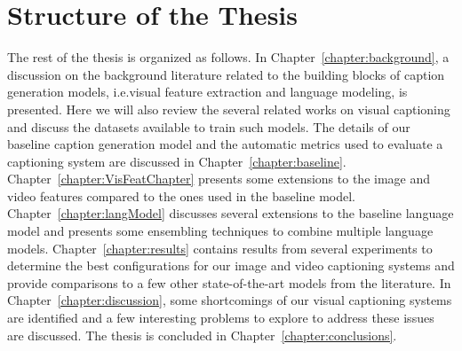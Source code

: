 \section{Structure of the Thesis}
\label{section:structure} 
The rest of the thesis is organized as follows.
In Chapter~\ref{chapter:background}, a discussion on the background literature
related to the building blocks of caption generation models, i.e.\@ visual
feature extraction and language modeling, is presented. 
Here we will also review the several related works on visual captioning
and discuss the datasets available to train such models.
The details of our baseline caption generation model and the automatic metrics
used to evaluate a captioning system are discussed in
Chapter~\ref{chapter:baseline}. 
Chapter~\ref{chapter:VisFeatChapter} presents some extensions to the image
and video features compared to the ones used in the baseline model.
Chapter~\ref{chapter:langModel} discusses several extensions to the baseline
language model and presents some ensembling techniques to combine multiple
language models.
Chapter~\ref{chapter:results} contains results from several experiments to
determine the best configurations for our image and video captioning systems and
provide comparisons to a few other state-of-the-art models from the literature.
In Chapter~\ref{chapter:discussion}, some shortcomings of our visual captioning
systems are identified and a few interesting problems to explore to address
these issues are discussed.
The thesis is concluded in Chapter~\ref{chapter:conclusions}.
